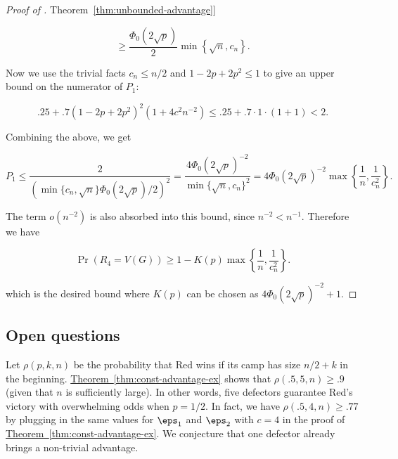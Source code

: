 \documentclass[11pt]{article}
\numberwithin{equation}{section}
\theoremstyle{definition}
\theoremstyle{plain}
\newcommand{\expref}[2]{\hyperref[#2]{#1~\ref{#2}}}
\begin{document}
\begin{proof}[Proof of \expref{Theorem}{thm:unbounded-advantage}]
\begin{linenomath}
\begin{equation*}
						\ge \frac{\Phi_0\left(2\sqrt{p}\right)}{2}\min\left\{\sqrt{n}, c_n \right\}.
				\end{equation*}\end{linenomath}
				Now we use the trivial facts $c_n \le n/2$ and $1 - 2p + 2p^2 \le 1$ 
				to give an upper bound on %
				the numerator of $P_1$:
				\begin{linenomath}\begin{equation*}
						.25 + .7(1 - 2p + 2p^2)^2 \left(1 + 4c^2n^{-2}\right) \le .25 + .7 \cdot 1 \cdot (1 + 1) < 2.
				\end{equation*}\end{linenomath}
				Combining the above, we get
				\begin{linenomath}\begin{equation*}
						P_1 \le \frac{2}{\left(\min\{c_n, \sqrt{n}\}\Phi_0(2\sqrt{p})/2 \right)^2}
						= \frac{4\Phi_0(2\sqrt{p})^{-2}}{\min\{\sqrt{n}, c_n\}^2}
						= 4\Phi_0(2\sqrt{p})^{-2} \max\left\{\frac{1}{n}, \frac{1}{c_n^2}\right\}.
				\end{equation*}\end{linenomath}
				The term $o(n^{-2})$ is also absorbed into this bound, since $n^{-2} < n^{-1}$.
				Therefore we have
				\begin{linenomath}\begin{equation*}
						\Pr(R_4 = V(G)) \ge 1 - K(p)\max\left\{\frac{1}{n}, \frac{1}{c_n^2}\right\}.
				\end{equation*}\end{linenomath}
				which is the desired bound where $K(p)$ can be chosen as $4\Phi_0(2\sqrt{p})^{-2} + 1$.
			\end{proof}
			
			
			
			
			
			\subsection {Open questions}
			
			
			Let $\rho(p, k, n)$ be the probability that Red %
			wins  %
			if its camp has size $n/2 + k$ in the beginning.
			\expref{Theorem}{thm:const-advantage-ex} shows that $\rho (.5, 5, n) \ge .9$ (given that $n$ is sufficiently large).
			In other words, five defectors guarantee Red's victory with overwhelming odds when $p = 1/2$.
			In fact, we have $\rho(.5, 4, n) \ge .77$ by plugging in the same values for $\eps_1$ and $\eps_2$ with $c = 4$ in 
			the proof of \expref{Theorem}{thm:const-advantage-ex}.  %
			We conjecture that one defector already brings a non-trivial advantage.
			
\end{document}
